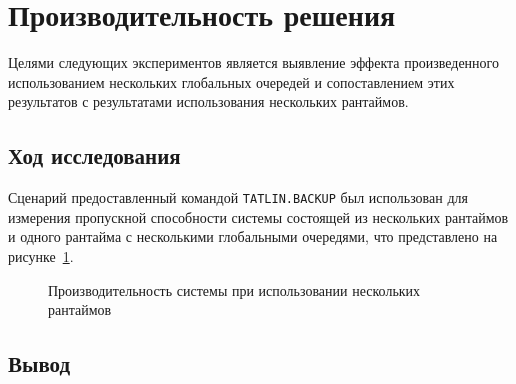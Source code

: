 \section{Производительность решения}

Целями следующих экспериментов является выявление эффекта произведенного использованием нескольких глобальных очередей и сопоставлением этих результатов с результатами использования нескольких рантаймов.

\subsection{Ход исследования}

Сценарий предоставленный командой \verb|TATLIN.BACKUP| был использован для измерения пропускной способности системы состоящей из нескольких рантаймов и одного рантайма с несколькими глобальными очередями, что представлено на рисунке~\ref{fig:tatlin:multi_rt_gp:eval}.

\begin{figure}[H]
    \begin{center}
    \end{center}

    \caption{Производительность системы при использовании нескольких рантаймов}
    \label{fig:tatlin:multi_rt_gp:eval}
\end{figure}

\subsection{Вывод}

